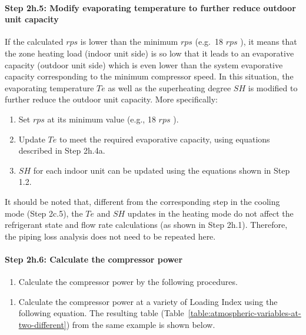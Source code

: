 \paragraph{Step 2h.5: Modify evaporating temperature to further reduce outdoor unit capacity}\label{step-2h.5-modify-evaporating-temperature-to-further-reduce-outdoor-unit-capacity}

If the calculated \(rps\) is lower than the minimum \(rps\) (e.g.~18 \(rps\) ), it means that the zone heating load (indoor unit side) is so low that it leads to an evaporative capacity (outdoor unit side) which is even lower than the system evaporative capacity corresponding to the minimum compressor speed. In this situation, the evaporating temperature \(Te\) as well as the superheating degree \(SH\) is modified to further reduce the outdoor unit capacity. More specifically:

\begin{enumerate}
\def\labelenumi{\alph{enumi}.}
\item
  Set \(rps\) at its minimum value (e.g., 18 \(rps\) ).
\item
  Update \(Te\) to meet the required evaporative capacity, using equations described in Step 2h.4a.
\item
  \(SH\) for each indoor unit can be updated using the equations shown in Step 1.2.
\end{enumerate}

It should be noted that, different from the corresponding step in the cooling mode (Step 2c.5), the \(Te\) and \(SH\) updates in the heating mode do not affect the refrigerant state and flow rate calculations (as shown in Step 2h.1). Therefore, the piping loss analysis does not need to be repeated here.

\paragraph{Step 2h.6: Calculate the compressor power}\label{step-2h.6-calculate-the-compressor-power}

\begin{enumerate}
\def\labelenumi{(\arabic{enumi})}
\tightlist
\item
  Calculate the compressor power by the following procedures. 
\end{enumerate}

\begin{enumerate}
\def\labelenumi{\alph{enumi}.}
\tightlist
\item
  Calculate the compressor power at a variety of Loading Index using the following equation. The resulting table (Table~\ref{table:atmospheric-variables-at-two-different}) from the same example is shown below.
\end{enumerate}

